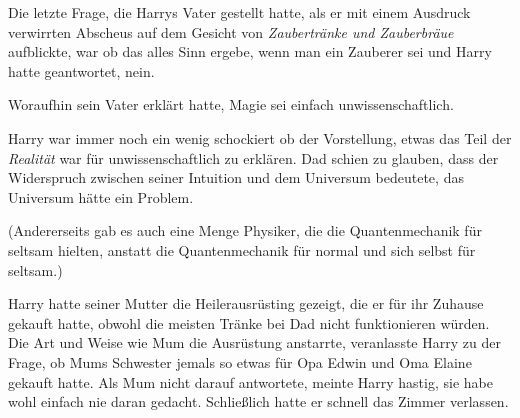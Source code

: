 Die letzte Frage, die Harrys Vater gestellt hatte, als er mit einem Ausdruck verwirrten Abscheus auf dem Gesicht von \emph{Zaubertränke und Zauberbräue} aufblickte, war ob das alles Sinn ergebe, wenn man ein Zauberer sei und Harry hatte geantwortet, nein.

Woraufhin sein Vater erklärt hatte, Magie sei einfach unwissenschaftlich.

Harry war immer noch ein wenig schockiert ob der Vorstellung, etwas das Teil der \emph{Realität} war für unwissenschaftlich zu erklären. Dad schien zu glauben, dass der Widerspruch zwischen seiner Intuition und dem Universum bedeutete, das Universum hätte ein Problem.

(Andererseits gab es auch eine Menge Physiker, die die Quantenmechanik für seltsam hielten, anstatt die Quantenmechanik für normal und sich selbst für seltsam.)

Harry hatte seiner Mutter die Heilerausrüsting gezeigt, die er für ihr Zuhause gekauft hatte, obwohl die meisten Tränke bei Dad nicht funktionieren würden. Die Art und Weise wie Mum die Ausrüstung anstarrte, veranlasste Harry zu der Frage, ob Mums Schwester jemals so etwas für Opa Edwin und Oma Elaine gekauft hatte. Als Mum nicht darauf antwortete, meinte Harry hastig, sie habe wohl einfach nie daran gedacht. Schließlich hatte er schnell das Zimmer verlassen.

